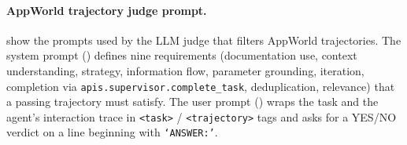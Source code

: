 %
%
%


\paragraph{AppWorld trajectory judge prompt.}
 show the prompts used by the LLM judge that filters AppWorld trajectories. The system prompt () defines nine requirements (documentation use, context understanding, strategy, information flow, parameter grounding, iteration, completion via \texttt{apis.supervisor.complete\_task}, deduplication, relevance) that a passing trajectory must satisfy. The user prompt () wraps the task and the agent's interaction trace in \texttt{<task>} / \texttt{<trajectory>} tags and asks for a YES/NO verdict on a line beginning with \texttt{`ANSWER:'}.


